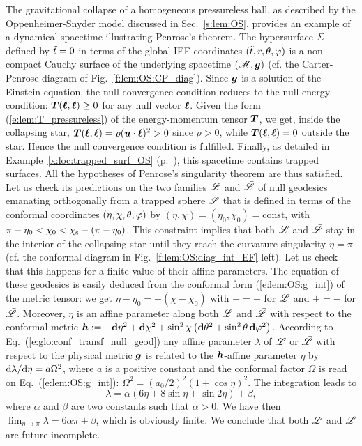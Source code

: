 \begin{example}
The gravitational collapse of a homogeneous pressureless ball, as
described by the Oppenheimer-Snyder model discussed in Sec.~\ref{s:lem:OS},
provides an example of a dynamical spacetime illustrating
Penrose's theorem.
The hypersurface $\Sigma$ defined by ${\tilde t}=0$ in terms of the global
IEF coordinates $({\tilde t}, r, \theta, \varphi)$ is a non-compact Cauchy surface of
the underlying spacetime $(\mathscr{M},\bm{g})$ (cf. the Carter-Penrose diagram
of Fig.~\ref{f:lem:OS:CP_diag}). Since $\bm{g}$ is a solution of the Einstein
equation, the null convergence condition reduces to the null energy condition:
$\bm{T}(\bm{\ell},\bm{\ell}) \geq 0$ for any null vector $\bm{\ell}$.  Given the form
(\ref{e:lem:T_pressureless}) of the energy-momentum tensor $\bm{T}$, we get,
inside the collapsing star,
$\bm{T}(\bm{\ell},\bm{\ell}) = \rho (\bm{u}\cdot\bm{\ell})^2 > 0$ since $\rho > 0$, while
$\bm{T}(\bm{\ell},\bm{\ell}) = 0$ outside the star. Hence the null convergence condition
is fulfilled. Finally, as detailed in Example~\ref{x:loc:trapped_surf_OS}
(p.~\pageref{x:loc:trapped_surf_OS}), this spacetime contains trapped surfaces.
All the hypotheses of Penrose's singularity theorem are thus satisfied.
Let us check its predictions on the two families $\mathscr{L}$ and $\bar{\mathscr{L}}$
of null geodesics emanating orthogonally from a trapped
sphere $\mathscr{S}$ that is defined in terms of the conformal coordinates
$(\eta,\chi,\theta,\varphi)$ by $(\eta,\chi) = (\eta_0,\chi_0) = \mathrm{const}$,
with
$\pi - \eta_0 < \chi_0 < \chi_{\rm s} - (\pi - \eta_0)$. This constraint implies
that both $\mathscr{L}$ and $\bar{\mathscr{L}}$
stay in the interior of the collapsing star until they reach
the curvature singularity $\eta=\pi$ (cf. the conformal diagram in
Fig.~\ref{f:lem:OS:diag_int_EF} left). Let us check that this happens for
a finite value of their affine parameters. The equation of these geodesics
is easily deduced from the conformal form (\ref{e:lem:OS:g_int}) of the metric tensor:
we get $\eta - \eta_0 = \pm (\chi - \chi_0)$ with $\pm = +$
for $\mathscr{L}$ and $\pm = -$ for $\bar{\mathscr{L}}$.
Moreover, $\eta$ is an affine parameter
along both $\mathscr{L}$ and $\bar{\mathscr{L}}$ with respect to the conformal metric
 $\bm{h} := - \mathbf{d}\eta^2 + \mathbf{d}\chi^2
        + \sin^2\chi \left( \mathbf{d}\theta^2 + \sin^2\theta\, \mathbf{d}\varphi^2 \right)$.
According to Eq.~(\ref{e:glo:conf_transf_null_geod}) any affine parameter $\lambda$
of $\mathscr{L}$ or $\bar{\mathscr{L}}$ with respect to the physical metric $\bm{g}$ is related
to the $\bm{h}$-affine parameter $\eta$ by $\mathrm{d}\lambda/\mathrm{d}\eta = a \Omega^2$, where $a$
is a positive constant and the
conformal factor $\Omega$ is read on Eq.~(\ref{e:lem:OS:g_int}):
$\Omega^2 = (a_0/2)^2 (1 + \cos\eta)^2$. The integration leads to
\[
    \lambda = \alpha \left( 6 \eta + 8 \sin\eta + \sin 2\eta \right) + \beta ,
\]
where $\alpha$ and $\beta$ are two constants such that $\alpha>0$. We have then
$\lim_{\eta\to\pi} \lambda = 6\alpha\pi + \beta$, which is obviously finite. We conclude that
both $\mathscr{L}$ and $\bar{\mathscr{L}}$ are future-incomplete.
\end{example}


